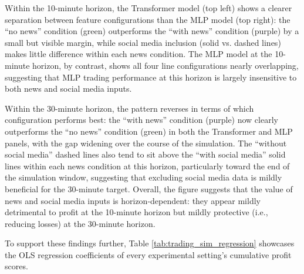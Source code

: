 \documentclass[stu,floatsintext]{apa7}
\begin{document}
Within the 10-minute horizon, the Transformer model (top left) shows a clearer separation between feature configurations than the MLP model (top right): the ``no news'' condition (green) outperforms the ``with news'' condition (purple) by a small but visible margin, while social media inclusion (solid vs. dashed lines) makes little difference within each news condition. The MLP model at the 10-minute horizon, by contrast, shows all four line configurations nearly overlapping, suggesting that MLP trading performance at this horizon is largely insensitive to both news and social media inputs.

Within the 30-minute horizon, the pattern reverses in terms of which configuration performs best: the ``with news'' condition (purple) now clearly outperforms the ``no news'' condition (green) in both the Transformer and MLP panels, with the gap widening over the course of the simulation. The ``without social media'' dashed lines also tend to sit above the ``with social media'' solid lines within each news condition at this horizon, particularly toward the end of the simulation window, suggesting that excluding social media data is mildly beneficial for the 30-minute target. Overall, the figure suggests that the value of news and social media inputs is horizon-dependent: they appear mildly detrimental to profit at the 10-minute horizon but mildly protective (i.e., reducing losses) at the 30-minute horizon.

To support these findings further, Table \ref{tab:trading_sim_regression} showcases the OLS regression coefficients of every experimental setting's cumulative profit scores.
\medskip
\medskip
\end{document}
